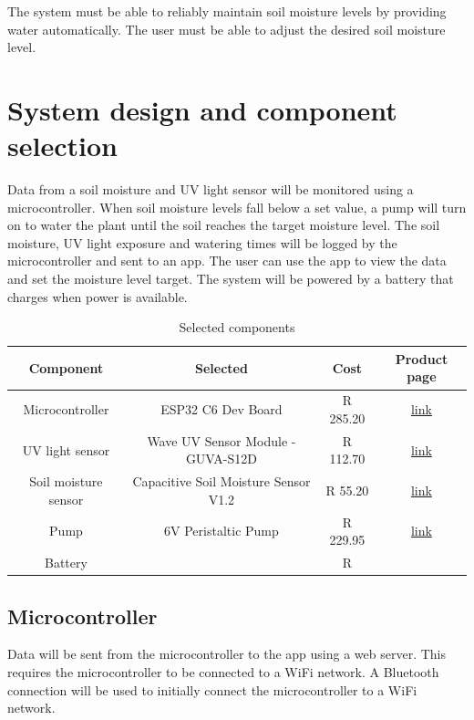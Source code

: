 The system must be able to reliably maintain soil moisture levels by providing water automatically. The user must be able to adjust the desired soil moisture level.

\section{System design and component selection}

Data from a soil moisture and UV light sensor will be monitored using a microcontroller. When soil moisture levels fall below a set value, a pump will turn on to water the plant until the soil reaches the target moisture level. The soil moisture, UV light exposure and watering times will be logged by the microcontroller and sent to an app. The user can use the app to view the data and set the moisture level target. The system will be powered by a battery that charges when power is available.

\begin{table}[!h]
    \centering
    \begin{tabular}{|c|c|c|c|}
        \hline
        Component & Selected & Cost & Product page \\
        \hline
        Microcontroller &  ESP32 C6 Dev Board & R 285.20 & \href{https://www.robotics.org.za/ESP32-C6-DEV}{link} \\
        UV light sensor & Wave UV Sensor Module - GUVA-S12D & R 112.70 & \href{https://www.robotics.org.za/W9537}{link} \\
        Soil moisture sensor & Capacitive Soil Moisture Sensor V1.2 & R 55.20 & \href{https://www.robotics.org.za/CAP-SW-12}{link} \\
        Pump & 6V Peristaltic Pump & R 229.95 & \href{https://www.diyelectronics.co.za/store/motors/4627-6v-peristaltic-pump-100mlmin.html}{link} \\
        Battery & & R & \\
        \hline
    \end{tabular}
    \caption{Selected components}
    \label{tab:components_selected}
\end{table}

\subsection{Microcontroller}
Data will be sent from the microcontroller to the app using a web server. This requires the microcontroller to be connected to a WiFi network. A Bluetooth connection will be used to initially connect the microcontroller to a WiFi network.

